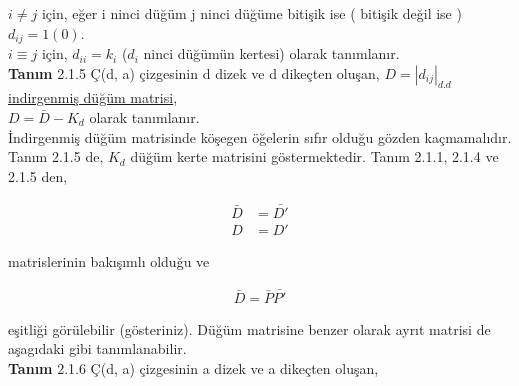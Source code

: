 \documentclass[11pt]{amsbook}
\begin{document}


 $i \neq j$ için, eğer i ninci düğüm j ninci düğüme bitişik ise ( bitişik değil ise ) $d_{ij} = 1 (0) $.
 \\
 $i \equiv j$ için, $d_{ii} =  k_{i} $ ($d_{i}$ ninci düğümün kertesi) olarak tanımlanır.
\\

\textbf{Tanım} 2.1.5 Ç(d, a) çizgesinin d dizek ve d dikeçten oluşan, $D = \left | d_{ij} \right |_{d.d}$ \underline{indirgenmiş düğüm matrisi},
\\
$D = \bar{D} - K_{d}$ olarak tanımlanır.
\\

İndirgenmiş düğüm matrisinde köşegen öğelerin sıfır olduğu gözden kaçmamalıdır. Tanım 2.1.5 de, $K_{d}$ düğüm kerte matrisini göstermektedir. Tanım 2.1.1, 2.1.4 ve 2.1.5 den, 

\begin{align*} 
	\bar{D} &=   \bar{D'} \\ 
	                D &=  D'
\end{align*}

matrislerinin bakışımlı olduğu ve 

\begin{align*}
\bar{D} = \bar{P}\bar{P'}
\end{align*}

eşitliği görülebilir (gösteriniz). Düğüm matrisine benzer olarak ayrıt matrisi de aşagıdaki gibi tanımlanabilir.
\\

\textbf{Tanım} 2.1.6 Ç(d, a) çizgesinin a dizek ve a dikeçten oluşan,




\end{document}
